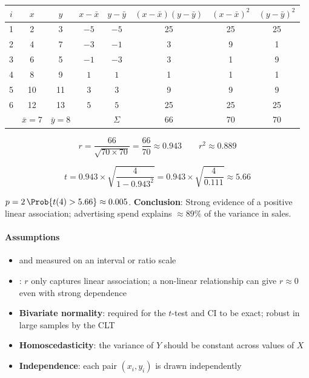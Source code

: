 \begin{center}
\begin{tabular}{|c|c|c|c|c|c|c|c|}
    \hline
    $i$ & $x$ & $y$ & $x - \bar{x}$ & $y - \bar{y}$ & $(x-\bar{x})(y-\bar{y})$ & $(x-\bar{x})^2$ & $(y-\bar{y})^2$ \\
    \hline
    1 & 2  & 3  & $-5$ & $-5$ & 25 & 25 & 25 \\
    2 & 4  & 7  & $-3$ & $-1$ &  3 &  9 &  1 \\
    3 & 6  & 5  & $-1$ & $-3$ &  3 &  1 &  9 \\
    4 & 8  & 9  &  $1$ &  $1$ &  1 &  1 &  1 \\
    5 & 10 & 11 &  $3$ &  $3$ &  9 &  9 &  9 \\
    6 & 12 & 13 &  $5$ &  $5$ & 25 & 25 & 25 \\
    \hline
    & $\bar{x}=7$ & $\bar{y}=8$ & & $\Sigma$ & 66 & 70 & 70 \\
    \hline
\end{tabular}
\end{center}

$$r = \frac{66}{\sqrt{70 \times 70}} = \frac{66}{70} \approx 0.943
\qquad r^2 \approx 0.889$$

$$t = 0.943 \times \sqrt{\frac{4}{1 - 0.943^2}} = 0.943 \times \sqrt{\frac{4}{0.111}} \approx 5.66$$

$p = 2\,\Prob{t(4) > 5.66} \approx 0.005$. \textbf{Conclusion}: Strong evidence of a
positive linear association; advertising spend explains $\approx 89\%$ of the variance
in sales.

\paragraph{Assumptions}
\begin{itemize}
    \item {} and measured on an interval or ratio scale
    \item {}: $r$ only captures linear association; a non-linear
        relationship can give $r \approx 0$ even with strong dependence
    \item \textbf{Bivariate normality}: required for the $t$-test and CI to be exact;
        robust in large samples by the CLT
    \item \textbf{Homoscedasticity}: the variance of $Y$ should be constant across
        values of $X$
    \item \textbf{Independence}: each pair $(x_i, y_i)$ is drawn independently
\end{itemize}

